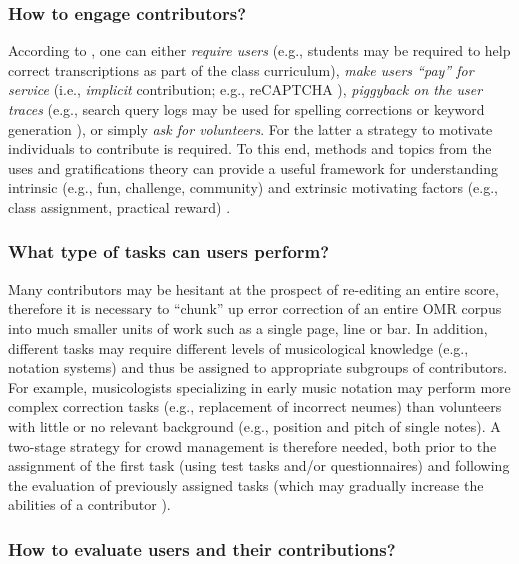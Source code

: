 \documentclass[letterpaper,10pt,pagesize=pdftex,headings=normal]{scrreprt}
\begin{document}
\subsubsection*{How to engage contributors?}

According to \citet{doan2011}, one can either \emph{require users} (e.g., students may be required to help correct transcriptions as part of the class curriculum), \emph{make users ``pay'' for service} (i.e., \emph{implicit} contribution; e.g., reCAPTCHA \citep{ahn2008}), \emph{piggyback on the user traces} (e.g., search query logs may be used for spelling corrections \citep{ahmad2005} or keyword generation \citep{fuxman2008}), or simply \emph{ask for volunteers}. For the latter a strategy to motivate individuals to contribute is required. To this end, methods and topics from the uses and gratifications theory can provide a useful framework for understanding intrinsic (e.g., fun, challenge, community) and extrinsic motivating factors (e.g., class assignment, practical reward) \citep{brabham2013}. 

\subsubsection*{What type of tasks can users perform?}

Many contributors may be hesitant at the prospect of re-editing an entire score, therefore it is necessary to ``chunk'' up error correction of an entire OMR corpus into much smaller units of work such as a single page, line or bar. In addition, different tasks may require different levels of musicological knowledge (e.g., notation systems) and thus be assigned to appropriate subgroups of contributors. For example, musicologists specializing in early music notation may perform more complex correction tasks (e.g., replacement of incorrect neumes) than volunteers with little or no relevant background (e.g., position and pitch of single notes). A two-stage strategy for crowd management is therefore needed, both prior to the assignment of the first task (using test tasks and/or questionnaires) and following the evaluation of previously assigned tasks (which may gradually increase the abilities of a contributor \citep{shen2003}).  

\subsubsection*{How to evaluate users and their contributions?}
\end{document}
